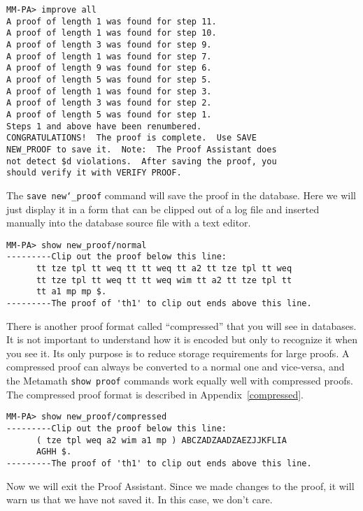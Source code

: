\begin{verbatim}
MM-PA> improve all
A proof of length 1 was found for step 11.
A proof of length 1 was found for step 10.
A proof of length 3 was found for step 9.
A proof of length 1 was found for step 7.
A proof of length 9 was found for step 6.
A proof of length 5 was found for step 5.
A proof of length 1 was found for step 3.
A proof of length 3 was found for step 2.
A proof of length 5 was found for step 1.
Steps 1 and above have been renumbered.
CONGRATULATIONS!  The proof is complete.  Use SAVE
NEW_PROOF to save it.  Note:  The Proof Assistant does
not detect $d violations.  After saving the proof, you
should verify it with VERIFY PROOF.
\end{verbatim}

The \texttt{save new{\char`\_}proof} command will save the proof in the database.  Here
we will just display it in a form that can be clipped out of a log file
and inserted manually into the database source file with a text
editor.

\begin{verbatim}
MM-PA> show new_proof/normal
---------Clip out the proof below this line:
      tt tze tpl tt weq tt tt weq tt a2 tt tze tpl tt weq
      tt tze tpl tt weq tt tt weq wim tt a2 tt tze tpl tt
      tt a1 mp mp $.
---------The proof of 'th1' to clip out ends above this line.
\end{verbatim}

There is another proof format called ``compressed'' that you will see in databases.  It is
not important to understand how it is encoded but only to recognize it
when you see it.  Its only purpose is to reduce storage requirements for
large proofs.  A compressed proof can always be converted to a normal
one and vice-versa, and the Metamath \texttt{show proof}
commands work equally well with
compressed proofs.  The compressed proof format is described in
Appendix~\ref{compressed}.

\begin{verbatim}
MM-PA> show new_proof/compressed
---------Clip out the proof below this line:
      ( tze tpl weq a2 wim a1 mp ) ABCZADZAADZAEZJJKFLIA
      AGHH $.
---------The proof of 'th1' to clip out ends above this line.
\end{verbatim}

Now we will exit the Proof Assistant.  Since we made changes to the proof,
it will warn us that we have not saved it.  In this case, we don't care.

